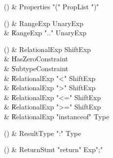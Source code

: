 \begin{bbgrammarappendix}

() & Properties \label{prod:Properties}  \: \xcd"(" PropList \xcd")"  \\


\end{bbgrammarappendix}

\begin{bbgrammarappendix}

() & RangeExp \label{prod:RangeExp}  \: UnaryExp  \\

 &    \| RangeExp  \xcd".." UnaryExp  \\

\end{bbgrammarappendix}

\begin{bbgrammarappendix}

() & RelationalExp \label{prod:RelationalExp}  \: ShiftExp  \\

 &    \| HasZeroConstraint \\
 &    \| SubtypeConstraint \\
 &    \| RelationalExp \xcd"<" ShiftExp \\
 &    \| RelationalExp \xcd">" ShiftExp \\
 &    \| RelationalExp \xcd"<=" ShiftExp \\
 &    \| RelationalExp \xcd">=" ShiftExp \\
 &    \| RelationalExp \xcd"instanceof" Type \\

\end{bbgrammarappendix}

\begin{bbgrammarappendix}

() & ResultType \label{prod:ResultType}  \: \xcd":" Type  \\


\end{bbgrammarappendix}

\begin{bbgrammarappendix}

() & ReturnStmt \label{prod:ReturnStmt}  \: \xcd"return" Exp\opt \xcd";"  \\


\end{bbgrammarappendix}

